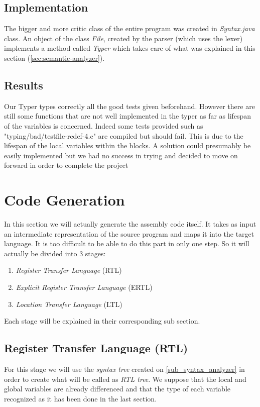 \documentclass[conference]{IEEEtran}
\theoremstyle{definition}
\begin{document}
\subsection{Implementation}
The bigger and more critic class of the entire program was created in \textit{Syntax.java} class. An object of the class \textit{File}, created by the parser (which uses the lexer) implements a method called \textit{Typer} which takes care of what was explained in this section (\ref{sec:semantic-analyzer}).

\subsection{Results}
Our Typer types correctly all the good tests given beforehand. However there are still some functions that are not well implemented in the typer as far as lifespan of the variables is concerned. Indeed some tests provided such as "typing/bad/testfile-redef-4.c" are compiled but should fail. This is due to the lifespan of the local variables within the blocks. A solution could presumably be easily implemented but we had no success in trying and decided to move on forward in order to complete the project

\section{Code Generation}
In this section we will actually generate the assembly code itself. It takes as input an intermediate representation of the source program and maps it into the target language.
It is too difficult to be able to do this part in only one step. So it will actually be divided into 3 stages:
\begin{enumerate}
	\item \textit{Register Transfer Language} (RTL)
	\item \textit{Explicit Register Transfer Language} (ERTL)
	\item \textit{Location Transfer Language} (LTL)
\end{enumerate}
Each stage will be explained in their corresponding sub section.

\subsection{Register Transfer Language (RTL)} \label{sec:RTL}
For this stage we will use the \textit{syntax tree} created on \ref{sub_syntax_analyzer} in order to create what will be called as \textit{RTL tree}. We suppose that the local and global variables are already differenced and that the type of each variable recognized as it has been done in the last section.
\end{document}
